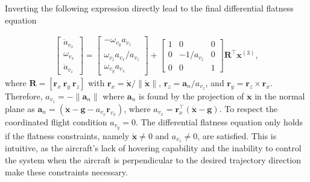 Inverting the following expression directly lead to the final differential flatness equation

\begin{equation}
\begin{aligned}
\begin{bmatrix}
\dot{a}_{v_x} \\
\omega_{v_x} \\
\dot{a}_{v_z}
\end{bmatrix} = 
\begin{bmatrix}
-\omega_{v_y}a_{v_z} \\
\omega_{v_z}a_{v_x}/a_{v_z} \\
\omega_{v_y}a_{v_x}
\end{bmatrix} + 
\begin{bmatrix}
1 & 0 & 0 \\
0 & -1/a_{v_z} & 0 \\
0 & 0 & 1
\end{bmatrix} \mathbf{R}^\top
\mathbf{x}^{(3)},
\end{aligned}
\label{eq:differential_flatness}
\end{equation}
where $\mathbf{R}=[\mathbf{r}_{x}~\mathbf{r}_{y}~\mathbf{r}_{z}]$ with $\mathbf{r}_{x} = \dot{\mathbf{x}}/\lVert{\dot{\mathbf{x}}}\rVert$, 
$\mathbf{r}_{z} = \mathbf{a}_{n} / a_{v_z}$, and $\mathbf{r}_{y} = \mathbf{r}_{z} \times \mathbf{r}_{x}$. 
Therefore, $a_{v_z} = - \lVert{\mathbf{a}_{n}}\rVert $ where $\mathbf{a}_{n}$ is found by the projection of $\ddot{\mathbf{x}}$ in the normal plane as $\mathbf{a}_{n} = (\ddot{\mathbf{x}}- \mathbf{g} - a_{v_x} \mathbf{r}_{v_x})$, where $a_{v_x} = \mathbf{r}_{x}^\top (\ddot{\mathbf{x}} - \mathbf{g})$. To respect the coordinated flight condition $a_{v_y} = 0$. The differential flatness equation only holds if the flatness constraints, namely $\mathbf{\dot{x}} \neq 0$ and $a_{v_z} \neq 0$, are satisfied. This is intuitive, as the aircraft's lack of hovering capability and the inability to control the system when the aircraft is perpendicular to the desired trajectory direction make these constraints necessary.

